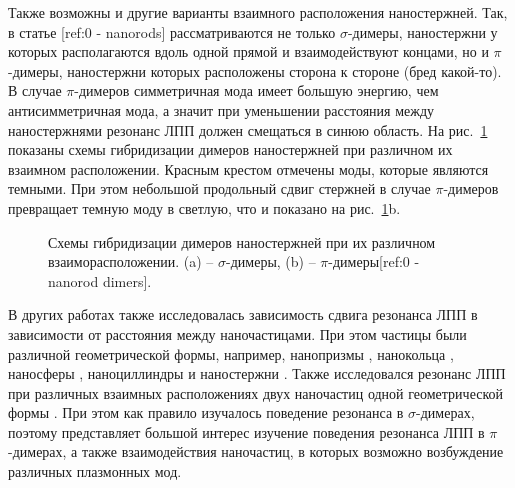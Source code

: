 Также возможны и другие варианты взаимного расположения наностержней. Так, в статье [ref:0 - nanorods] рассматриваются не только $ \sigma$-димеры, наностержни у которых располагаются вдоль одной прямой и взаимодействуют концами, но и $ \pi$-димеры, наностержни которых расположены сторона к стороне (бред какой-то). В случае $ \pi$-димеров симметричная мода имеет большую энергию, чем антисимметричная мода, а значит при уменьшении расстояния между наностержнями резонанс ЛПП должен смещаться в синюю область. На рис.~\ref{img:dimer_resonances} показаны схемы гибридизации димеров наностержней при различном их взаимном расположении. Красным крестом отмечены моды, которые являются темными. При этом небольшой продольный сдвиг стержней в случае $ \pi$-димеров превращает темную моду в светлую, что и показано на рис.~\ref{img:dimer_resonances}b. 

\begin{figure}[t]
\caption{Схемы гибридизации димеров наностержней при их различном взаиморасположении. (a) -- $ \sigma$-димеры, (b) -- $ \pi $-димеры[ref:0 - nanorod dimers].}
\label{img:dimer_resonances}
\end{figure}

В других работах также исследовалась зависимость сдвига резонанса ЛПП в зависимости от расстояния между наночастицами. При этом частицы были различной геометрической формы, например, нанопризмы \cite{nanoprism, nanoshells}, нанокольца \cite{nanoring}, наносферы \cite{nanospheres, nanospheres2}, наноциллиндры \cite{nanocyllinders} и наностержни \cite{nanorods}. Также исследовался резонанс ЛПП при различных взаимных расположениях двух наночастиц одной геометрической формы \cite{nanorods2, nanorods3, 3druler}. При этом как правило изучалось поведение резонанса в $ \sigma$-димерах, поэтому представляет большой интерес изучение поведения резонанса ЛПП в $ \pi$-димерах, а также взаимодействия наночастиц, в которых возможно возбуждение различных плазмонных мод.

% 
